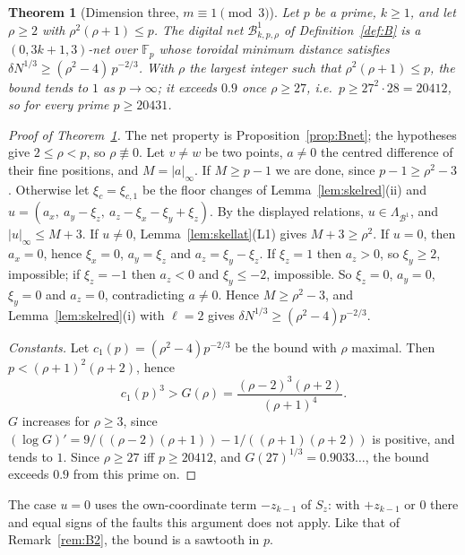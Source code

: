 \documentclass[11pt]{amsart}
\newtheorem{theorem}{Theorem}
\theoremstyle{definition}
\theoremstyle{plain}
\newcommand{\F}{\mathbb{F}}
\begin{document}
\begin{theorem}[Dimension three, $m\equiv1\pmod3$]\label{thm:allm}
Let $p$ be a prime, $k\ge1$, and let $\rho\ge2$ with $\rho^2(\rho+1)\le p$. The digital net $\mathcal B^1_{k,p,\rho}$ of Definition~\ref{def:B} is a $(0,3k+1,3)$-net over $\F_p$ whose toroidal minimum distance satisfies $\delta N^{1/3}\ge(\rho^2-4)\,p^{-2/3}$. With $\rho$ the largest integer such that $\rho^2(\rho+1)\le p$, the bound tends to $1$ as $p\to\infty$; it exceeds $0.9$ once $\rho\ge27$, i.e.\ $p\ge27^2\cdot28=20412$, so for every prime $p\ge20431$.
\end{theorem}

\begin{proof}[Proof of Theorem~\ref{thm:allm}]
The net property is Proposition~\ref{prop:Bnet}; the hypotheses give $2\le\rho<p$, so $\rho\not\equiv0$. Let $v\ne w$ be two points, $a\ne0$ the centred difference of their fine positions, and $M=|a|_\infty$. If $M\ge p-1$ we are done, since $p-1\ge\rho^2-3$. Otherwise let $\xi_c=\xi_{c,1}$ be the floor changes of Lemma~\ref{lem:skelred}(ii) and $u=(a_x,\ a_y-\xi_z,\ a_z-\xi_x-\xi_y+\xi_z)$. By the displayed relations, $u\in\Lambda_{\mathcal B^1}$, and $|u|_\infty\le M+3$. If $u\ne0$, Lemma~\ref{lem:skellat}(L1) gives $M+3\ge\rho^2$. If $u=0$, then $a_x=0$, hence $\xi_x=0$, $a_y=\xi_z$ and $a_z=\xi_y-\xi_z$. If $\xi_z=1$ then $a_z>0$, so $\xi_y\ge2$, impossible; if $\xi_z=-1$ then $a_z<0$ and $\xi_y\le-2$, impossible. So $\xi_z=0$, $a_y=0$, $\xi_y=0$ and $a_z=0$, contradicting $a\ne0$. Hence $M\ge\rho^2-3$, and Lemma~\ref{lem:skelred}(i) with $\ell=2$ gives $\delta N^{1/3}\ge(\rho^2-4)p^{-2/3}$.

\emph{Constants.} Let $c_1(p)=(\rho^2-4)p^{-2/3}$ be the bound with $\rho$ maximal. Then $p<(\rho+1)^2(\rho+2)$, hence
\[
c_1(p)^3>G(\rho)=\frac{(\rho-2)^3(\rho+2)}{(\rho+1)^4}.
\]
$G$ increases for $\rho\ge3$, since $(\log G)'=9/((\rho-2)(\rho+1))-1/((\rho+1)(\rho+2))$ is positive, and tends to $1$. Since $\rho\ge27$ iff $p\ge20412$, and $G(27)^{1/3}=0.9033\ldots$, the bound exceeds $0.9$ from this prime on.
\end{proof}

The case $u=0$ uses the own-coordinate term $-z_{k-1}$ of $S_z$: with $+z_{k-1}$ or $0$ there and equal signs of the faults this argument does not apply. Like that of Remark~\ref{rem:B2}, the bound is a sawtooth in $p$.
\end{document}

